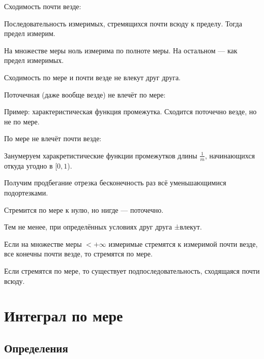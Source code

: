 \documentclass[12pt, a4paper, oneside]{memoir}
\begin{document}
Сходимость почти везде: 

\begin{claim}
    Последовательность измеримых, стремящихся почти всюду к пределу. Тогда предел измерим.

    На множестве меры ноль измерима по полноте меры.
    На остальном — как предел измеримых.
\end{claim}

Сходимость по мере и почти везде не влекут друг друга.

\begin{example}
    Поточечная (даже вообще везде) не влечёт по мере:

    Пример: характеристическая функция промежутка. Сходится поточечно везде, но не по мере.
\end{example}

\begin{example}
    По мере не влечёт почти везде: 
    
    Занумеруем харакретистические функции промежутков длины $\frac{1}{m}$,
    начинающихся откуда угодно в [$0, 1$).

    Получим продбегание отрезка бесконечность раз всё уменьшающимися подортезками.

    Стремится по мере к нулю, но нигде — поточечно.
\end{example}

Тем не менее, при определённых условиях друг друга ±влекут.

\begin{theorem}
    [Лебега]

    Если на множестве меры $< +\infty$ измеримые стремятся к измеримой почти везде,
    все конечны почти везде, то стремятся по мере.
\end{theorem}


\begin{theorem}
    [Риса]

    Если стремятся по мере, то существует подпоследовательность, сходящаяся почти всюду.
\end{theorem}





\section{Интеграл по мере}


\subsection{Определения}
\end{document}
